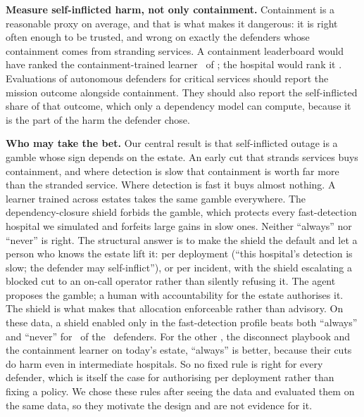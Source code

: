 
\textbf{Measure self-inflicted harm, not only containment.} Containment is
a reasonable proxy on average, and that is what makes it dangerous: it is
right often enough to be trusted, and wrong on exactly the defenders whose
containment comes from stranding services. A containment leaderboard would
have ranked the containment-trained learner \numQContainmentTodayRankContainment\
of \numRankAgents; the hospital would rank it \numQContainmentTodayRankClinical.
Evaluations of autonomous defenders for critical services should report
the mission outcome alongside containment. They should also report the
self-inflicted share of that outcome, which only a dependency model can
compute, because it is the part of the harm the defender chose.

\textbf{Who may take the bet.} Our central result is that self-inflicted
outage is a gamble whose sign depends on the estate. An early cut that
strands services buys containment, and where detection is slow that
containment is worth far more than the stranded service. Where detection is
fast it buys almost nothing. A learner trained across estates takes the same
gamble everywhere. The dependency-closure shield forbids the gamble, which
protects every fast-detection hospital we simulated and forfeits large gains
in slow ones. Neither ``always'' nor ``never'' is right. The structural
answer is to make the shield the default and let a person who knows the
estate lift it: per deployment (``this hospital's detection is slow; the
defender may self-inflict''), or per incident, with the shield escalating a
blocked cut to an on-call operator rather than silently refusing it. The
agent proposes the gamble; a human with accountability for the estate
authorises it. The shield is what makes that allocation enforceable rather
than advisory. On these data, a shield enabled only in the fast-detection
profile beats both ``always'' and ``never'' for \numPosthocFastOnlyBestCount\
of the \numPosthocDefenders\ defenders. For the other
\numPosthocAlwaysBestCount, the disconnect playbook and the containment
learner on today's estate, ``always'' is better, because their cuts do harm
even in intermediate hospitals. So no fixed rule is right for every
defender, which is itself the case for authorising per deployment rather
than fixing a policy. We chose these rules after seeing the data and
evaluated them on the same data, so they motivate the design and are not
evidence for it.

